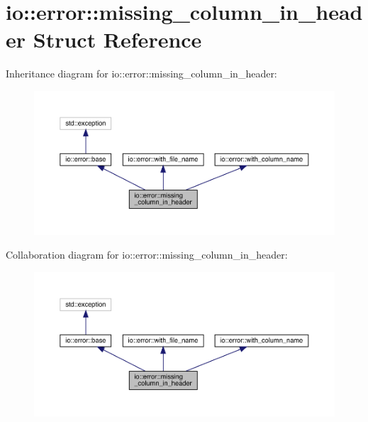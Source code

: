 \hypertarget{structio_1_1error_1_1missing__column__in__header}{}\section{io\+:\+:error\+:\+:missing\+\_\+column\+\_\+in\+\_\+header Struct Reference}
\label{structio_1_1error_1_1missing__column__in__header}


Inheritance diagram for io\+:\+:error\+:\+:missing\+\_\+column\+\_\+in\+\_\+header\+:\nopagebreak
\begin{figure}[H]
\begin{center}
\leavevmode
\includegraphics[width=350pt]{structio_1_1error_1_1missing__column__in__header__inherit__graph}
\end{center}
\end{figure}


Collaboration diagram for io\+:\+:error\+:\+:missing\+\_\+column\+\_\+in\+\_\+header\+:\nopagebreak
\begin{figure}[H]
\begin{center}
\leavevmode
\includegraphics[width=350pt]{structio_1_1error_1_1missing__column__in__header__coll__graph}
\end{center}
\end{figure}
